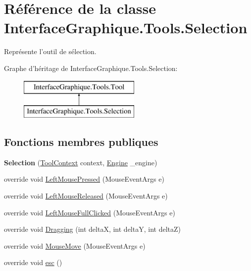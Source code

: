 \hypertarget{class_interface_graphique_1_1_tools_1_1_selection}{\section{Référence de la classe Interface\-Graphique.\-Tools.\-Selection}
\label{class_interface_graphique_1_1_tools_1_1_selection}
}


Représente l'outil de sélection.  


Graphe d'héritage de Interface\-Graphique.\-Tools.\-Selection\-:\begin{figure}[H]
\begin{center}
\leavevmode
\includegraphics[height=2.000000cm]{class_interface_graphique_1_1_tools_1_1_selection}
\end{center}
\end{figure}
\subsection*{Fonctions membres publiques}
\begin{DoxyCompactItemize}
\item 
\hypertarget{class_interface_graphique_1_1_tools_1_1_selection_ab1c1718fa669dd04112753ed5b1b4b04}{{\bfseries Selection} (\hyperlink{class_interface_graphique_1_1_tools_1_1_tool_context}{Tool\-Context} context, \hyperlink{class_interface_graphique_1_1_engine}{Engine} \-\_\-engine)}\label{class_interface_graphique_1_1_tools_1_1_selection_ab1c1718fa669dd04112753ed5b1b4b04}

\item 
override void \hyperlink{class_interface_graphique_1_1_tools_1_1_selection_acd046c5e27da4c8b720816a23aa72ff7}{Left\-Mouse\-Pressed} (Mouse\-Event\-Args e)
\item 
override void \hyperlink{class_interface_graphique_1_1_tools_1_1_selection_af1083f7026a963a718a9835e79e541b3}{Left\-Mouse\-Released} (Mouse\-Event\-Args e)
\item 
override void \hyperlink{class_interface_graphique_1_1_tools_1_1_selection_aef3afc03446b9419f0e664ac541b15de}{Left\-Mouse\-Full\-Clicked} (Mouse\-Event\-Args e)
\item 
override void \hyperlink{class_interface_graphique_1_1_tools_1_1_selection_ab88a610b3d7e5fb3e37386e0553ee30a}{Dragging} (int delta\-X, int delta\-Y, int delta\-Z)
\item 
override void \hyperlink{class_interface_graphique_1_1_tools_1_1_selection_a1b44917e1b656fcebe00ce72c77dbc65}{Mouse\-Move} (Mouse\-Event\-Args e)
\item 
override void \hyperlink{class_interface_graphique_1_1_tools_1_1_selection_ab825bb5bc10507fa0e3c653f9d0ce193}{esc} ()
\end{DoxyCompactItemize}
